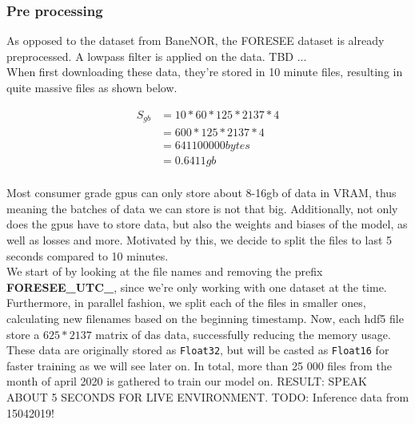 \subsubsection{Pre processing}

As opposed to the dataset from BaneNOR, the FORESEE dataset is already preprocessed. A lowpass filter is applied on the data. TBD ... \\

When first downloading these data, they're stored in 10 minute files, resulting in quite massive files as shown below.  

\begin{align*}
    S_{gb} &= 10 * 60 * 125 * 2137 * 4 \\
           &= 600 * 125 * 2137 * 4 \\
           &= 641100000 bytes \\ 
           &= 0.6411 gb \\
\end{align*}

Most consumer grade \acrshort{gpu}s can only store about 8-16gb of data in VRAM, thus meaning the batches of data we can store is not that big. Additionally, not only does the \acrshort{gpu}s have to store data, but also the weights and biases of the model, as well as losses and more. Motivated by this, we decide to split the files to last 5 seconds compared to 10 minutes. \\ 

We start of by looking at the file names and removing the prefix \textbf{FORESEE\_UTC\_}, since we're only working with one dataset at the time. Furthermore, in parallel fashion, we split each of the files in smaller ones, calculating new filenames based on the beginning timestamp. Now, each \acrshort{hdf5} file store a $625*2137$ matrix of \acrshort{das} data, successfully reducing the memory usage. 
These data are originally stored as \texttt{Float32}, but will be casted as \texttt{Float16} for faster training as we will see later on. In total, more than 25 000 files from the month of april 2020 is gathered to train our model on. 
RESULT: SPEAK ABOUT 5 SECONDS FOR LIVE ENVIRONMENT.
TODO: Inference data from 15042019!
